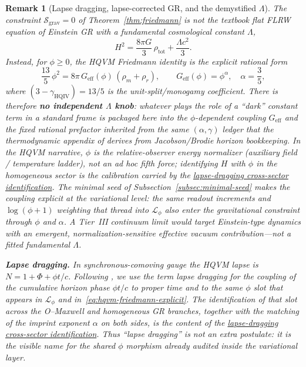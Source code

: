 \documentclass[11pt]{amsart}
\newtheorem{remark}[theorem]{Remark}
\begin{document}
\begin{remark}[\texorpdfstring{Lapse dragging, lapse-corrected GR, and the demystified $\Lambda$}{Lapse dragging, lapse-corrected GR, and demystified Lambda}]
\label{rem:lapse-lambda}
The constraint \(\mathcal{S}_{\mathrm{grav}}=0\) of Theorem~\ref{thm:friedmann} is \emph{not} the textbook flat FLRW equation of Einstein GR with a fundamental cosmological constant \(\Lambda\),
\[
H^2=\frac{8\pi G}{3}\,\rho_{\mathrm{tot}}+\frac{\Lambda c^2}{3}.
\]
Instead, for \(\phi\ge 0\), the HQVM Friedmann identity is the explicit rational form
\begin{equation}
\label{eq:hqvm-friedmann-explicit}
\frac{13}{5}\,\phi^2 = 8\pi\,G_{\mathrm{eff}}(\phi)\,(\rho_m+\rho_r),
\qquad G_{\mathrm{eff}}(\phi)=\phi^{\alpha},\quad \alpha=\frac35,
\end{equation}
where \((3-\gamma_{\mathrm{HQIV}})=13/5\) is the unit-split/monogamy coefficient. There is therefore \textbf{no independent \(\Lambda\) knob}: whatever plays the role of a ``dark'' constant term in a standard frame is packaged here into the \(\phi\)-dependent coupling \(G_{\mathrm{eff}}\) and the fixed rational prefactor inherited from the same \((\alpha,\gamma)\) ledger that the thermodynamic appendix of \cite{hqiv-3d-growth-paper} derives from Jacobson/Brodie horizon bookkeeping. In the HQVM narrative, \(\phi\) is the relative-observer energy normalizer (auxiliary field / temperature ladder), not an ad hoc fifth force; identifying \(H\) with \(\phi\) in the homogeneous sector is the calibration carried by the \hyperref[lean:lapse-bridge]{lapse-dragging cross-sector identification}. The minimal seed of Subsection~\ref{subsec:minimal-seed} makes the coupling explicit at the variational level: the same readout increments and \(\log(\phi+1)\) weighting that thread into \(\mathcal{L}_\phi\) also enter the gravitational constraint through \(\phi\) and \(\alpha\). A Tier~III continuum limit would target Einstein-type dynamics with an \emph{emergent}, normalization-sensitive effective vacuum contribution---not a fitted fundamental \(\Lambda\).

\medskip
\noindent\textbf{Lapse dragging.}
In synchronous-comoving gauge the HQVM lapse is \(N=1+\Phi+\phi t/c\). Following \cite{jacobson1995,brodie2026}, we use the term \emph{lapse dragging} for the coupling of the cumulative horizon phase \(\phi t/c\) to proper time \emph{and} to the same \(\phi\) slot that appears in \(\mathcal{L}_\phi\) and in~\eqref{eq:hqvm-friedmann-explicit}. The identification of that slot across the O--Maxwell and homogeneous GR branches, together with the matching of the imprint exponent \(\alpha\) on both sides, is the content of the \hyperref[lean:lapse-bridge]{lapse-dragging cross-sector identification}. Thus ``lapse dragging'' is not an extra postulate: it is the visible name for the shared \(\phi\) morphism already audited inside the variational layer.


\end{remark}
\end{document}
